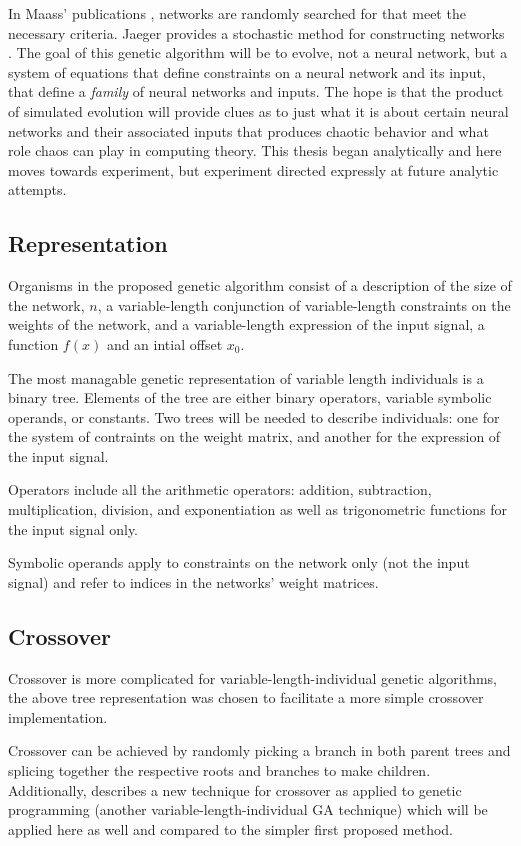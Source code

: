 \documentclass[12pt]{article}
\begin{document}
In Maass' publications \cite{maass_original}, 
networks are randomly searched for
that meet the necessary criteria.  Jaeger provides a stochastic method for
constructing networks \cite{jaeger_original}.  
The goal of this genetic algorithm will
be to evolve, not a neural network, but a system of equations that define
constraints on a neural network and its input, that define a 
\textit{family} of neural networks and inputs.  The hope is that the product
of simulated evolution will provide clues as to just what it is about 
certain neural networks and their associated inputs that produces
chaotic behavior
and what role chaos can play in computing theory.  This thesis began
analytically and here moves towards experiment, but experiment directed
expressly at future analytic attempts. 

\subsection{Representation}
Organisms in the proposed genetic algorithm consist of a description of the
size of the network, $n$, a variable-length conjunction of variable-length constraints on the weights of the network, and a variable-length expression of
the input signal, a function $f(x)$ and an intial offset $x_{0}$.

The most managable genetic representation of variable length individuals is
a binary tree.  Elements of the tree are either binary operators, variable
symbolic operands, or constants.  Two trees will be needed to describe 
individuals:  one for the system of contraints on the weight matrix, and 
another for the expression of the input signal.  

Operators include all the arithmetic operators:  addition, subtraction, multiplication, division, and exponentiation as well as trigonometric functions for the
input signal only.

Symbolic operands apply to constraints on the network only (not the input
signal) and refer to indices in the networks' weight matrices.

\subsection{Crossover}
Crossover is more complicated for variable-length-individual genetic algorithms,
the above tree representation was chosen to facilitate a more simple crossover
implementation.

Crossover can be achieved by randomly picking a branch in both parent trees
and splicing together the respective roots and branches to make children.
Additionally, \cite{clegg} describes a new technique for crossover as applied to
genetic programming (another variable-length-individual GA technique) which
will be applied here as well and compared to the simpler first proposed method.
\end{document}
